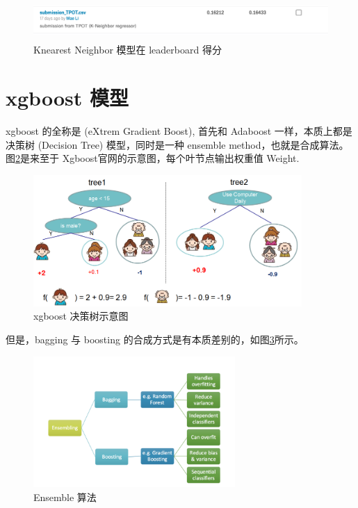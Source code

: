 \documentclass[a4paper]{article}
\begin{document}
\begin{figure}[ht]
 \centering
 \includegraphics[height=1.5cm,width=\textwidth]{images/knn}
 \caption{Knearest Neighbor 模型在 leaderboard 得分}
 \label{fig:knn}
\end{figure}

\section{xgboost 模型}
xgboost 的全称是 (eXtrem Gradient Boost), 首先和 Adaboost 一样，本质上都是决策树 (Decision Tree) 模型，同时是一种 ensemble method，也就是合成算法。图\ref{fig:twocart}是来至于 Xgboost官网的示意图，每个叶节点输出权重值 Weight.

\begin{figure}[ht]
 \centering
 \includegraphics[height=5cm,width=\textwidth]{images/twocart}
 \caption{xgboost 决策树示意图}
 \label{fig:twocart}
\end{figure}

但是，bagging 与 boosting 的合成方式是有本质差别的，如图\ref{fig:ensemble}所示。

\begin{figure}[ht]
 \centering
 \includegraphics[height=5cm,width=\textwidth]{images/ensemble}
 \caption{Ensemble 算法}
 \label{fig:ensemble}
\end{figure}
\end{document}
